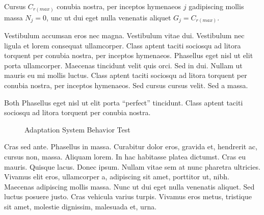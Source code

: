 Cursus $C_{r (max)}$ conubia nostra, per inceptos hymenaeos $j$ gadipiscing mollis massa $N_j = 0$, unc ut dui eget nulla venenatis aliquet $G_j = C_{r (max)}$.

Vestibulum accumsan eros nec magna. Vestibulum vitae dui. Vestibulum nec ligula et lorem consequat ullamcorper. Class aptent taciti sociosqu ad litora torquent per conubia nostra, per inceptos hymenaeos. Phasellus eget nisl ut elit porta ullamcorper. Maecenas tincidunt velit quis orci. Sed in dui. Nullam ut mauris eu mi mollis luctus. Class aptent taciti sociosqu ad litora torquent per conubia nostra, per inceptos hymenaeos. Sed cursus cursus velit. Sed a massa. 

Both  Phasellus eget nisl ut elit porta ``perfect'' tincidunt. Class aptent taciti sociosqu ad litora torquent per conubia nostra.

\begin{figure}[h]
        \caption{Adaptation System Behavior Test}
        \label{fig:fig:adapt_behave_2}
\end{figure}

Cras sed ante. Phasellus in massa. Curabitur dolor eros, gravida et, hendrerit ac, cursus non, massa. Aliquam lorem. In hac habitasse platea dictumst. Cras eu mauris. Quisque lacus. Donec ipsum. Nullam vitae sem at nunc pharetra ultricies. Vivamus elit eros, ullamcorper a, adipiscing sit amet, porttitor ut, nibh. Maecenas adipiscing mollis massa. Nunc ut dui eget nulla venenatis aliquet. Sed luctus posuere justo. Cras vehicula varius turpis. Vivamus eros metus, tristique sit amet, molestie dignissim, malesuada et, urna.